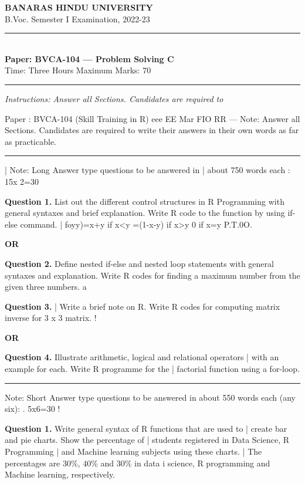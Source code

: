 \documentclass[11pt,a4paper]{article}
\begin{document}
\begin{center}
  {\large\bfseries BANARAS HINDU UNIVERSITY}\\[2pt]
  {\normalsize B.Voc. Semester I Examination, 2022-23}\\[6pt]
  \rule{0.8\linewidth}{0.5pt}\\[6pt]
  {\large\bfseries Paper: BVCA-104 --- Problem Solving C}\\[4pt]
  {\normalsize Time: Three Hours \hfill Maximum Marks: 70}
\end{center}

\rule{\linewidth}{0.4pt}

\smallskip
\noindent\textit{Instructions: Answer all Sections. Candidates are required to}

\bigskip

Paper : BVCA-104
(Skill Training in R)
eee EE Mar FIO
RR —
Note: Answer all Sections. Candidates are required to
write their answers in their own words as far as
practicable.

\bigskip{}
\rule{\linewidth}{0.4pt}\smallskip

| Note: Long Answer type questions to be answered in
| about 750 words each : 15x 2=30

\medskip\noindent\textbf{Question 1.} List out the different control structures in R
Programming with general syntaxes and brief
explanation. Write R code to the function by using
if-else command.
| foyy)=x+y if x<y
=(1-x-y) if x>y
0 if x=y
P.T.0O.
\centerline{\textbf{OR}}

\medskip\noindent\textbf{Question 2.} Define nested if-else and nested loop statements with
general syntaxes and explanation. Write R codes for
finding a maximum number from the given three
numbers. a

\medskip\noindent\textbf{Question 3.} | Write a brief note on R. Write R codes for computing
matrix inverse for 3 x 3 matrix. !
\centerline{\textbf{OR}}

\medskip\noindent\textbf{Question 4.} Illustrate arithmetic, logical and relational operators |
with an example for each. Write R programme for the |
factorial function using a for-loop.

\bigskip{}
\rule{\linewidth}{0.4pt}\smallskip

Note: Short Answer type questions to be answered in
about 550 words each (any six): . 5x6=30 !

\medskip\noindent\textbf{Question 1.} Write general syntax of R functions that are used to |
create bar and pie charts. Show the percentage of |
students registered in Data Science, R Programming |
and Machine learning subjects using these charts. |
The percentages are 30\%, 40\% and 30\% in data i
science, R programming and Machine learning,
respectively.
\end{document}
